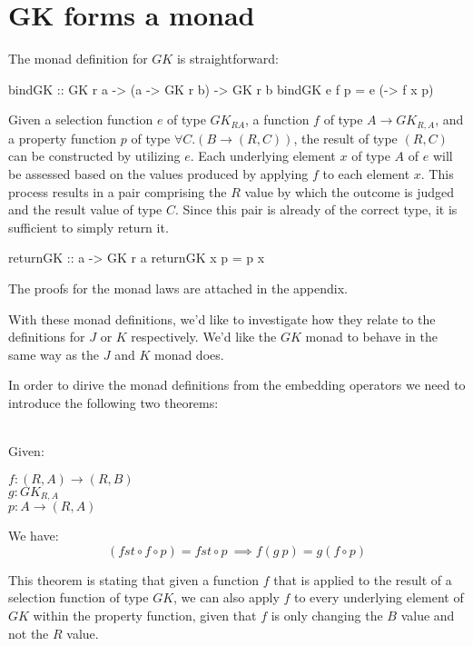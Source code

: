 \documentclass[runningheads]{llncs}
\newenvironment{reasoning}{\begin{adjustwidth}{0.2in}{}}{\end{adjustwidth}}
\begin{document}
\section{GK forms a monad}\label{gk-forms-a-monad}

The monad definition for \(GK\) is straightforward:

\begin{code}
bindGK :: GK r a -> (a -> GK r b) -> GK r b
bindGK e f p = e (\x -> f x p)
\end{code}

Given a selection function \(e\) of type \(GK_{R A}\), a function \(f\)
of type \(A \rightarrow GK_{R,A}\), and a property function \(p\) of
type \(\forall C. (B \rightarrow (R,C))\), the result of type \((R,C)\)
can be constructed by utilizing \(e\). Each underlying element \(x\) of
type \(A\) of \(e\) will be assessed based on the values produced by
applying \(f\) to each element \(x\). This process results in a pair
comprising the \(R\) value by which the outcome is judged and the result
value of type \(C\). Since this pair is already of the correct type, it
is sufficient to simply return it.

\begin{code}
returnGK :: a -> GK r a
returnGK x p = p x
\end{code}

The proofs for the monad laws are attached in the appendix.

With these monad definitions, we'd like to investigate how they relate
to the definitions for \(J\) or \(K\) respectively. We'd like the \(GK\)
monad to behave in the same way as the \(J\) and \(K\) monad does.

In order to dirive the monad definitions from the embedding operators we
need to introduce the following two theorems:

\begin{theorem}[Theorem 1]\\
Given:
\begin{reasoning}
$f : (R,A) \rightarrow (R,B)$\\
$g : GK_{R,A}$\\
$p : A \rightarrow (R,A)$
\end{reasoning}
We have:
\[(fst \circ f \circ p) = fst \circ p\ \implies f (g\:p) = g (f \circ p)\]
\end{theorem}

This theorem is stating that given a function \(f\) that is applied to
the result of a selection function of type \(GK\), we can also apply
\(f\) to every underlying element of \(GK\) within the property
function, given that \(f\) is only changing the \(B\) value and not the
\(R\) value. \newpage
\end{document}
